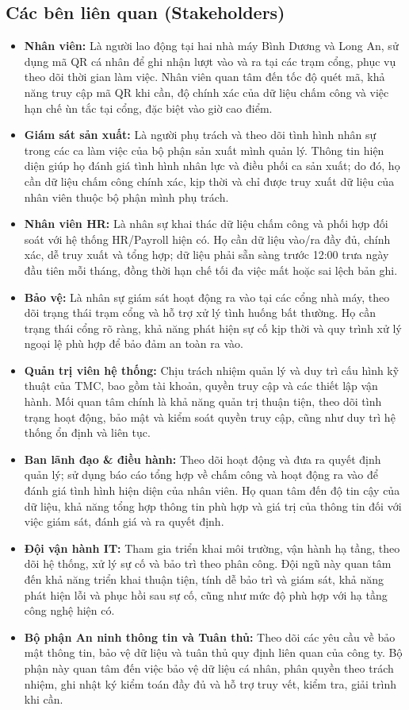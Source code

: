 \subsection{Các bên liên quan (Stakeholders)}

\begin{itemize}
    \item \textbf{Nhân viên:} Là người lao động tại hai nhà máy Bình Dương và Long An, sử dụng mã QR cá nhân để ghi nhận lượt vào và ra tại các trạm cổng, phục vụ theo dõi thời gian làm việc. Nhân viên quan tâm đến tốc độ quét mã, khả năng truy cập mã QR khi cần, độ chính xác của dữ liệu chấm công và việc hạn chế ùn tắc tại cổng, đặc biệt vào giờ cao điểm.
    \item \textbf{Giám sát sản xuất:} Là người phụ trách và theo dõi tình hình nhân sự trong các ca làm việc của bộ phận sản xuất mình quản lý. Thông tin hiện diện giúp họ đánh giá tình hình nhân lực và điều phối ca sản xuất; do đó, họ cần dữ liệu chấm công chính xác, kịp thời và chỉ được truy xuất dữ liệu của nhân viên thuộc bộ phận mình phụ trách.
    \item \textbf{Nhân viên HR:} Là nhân sự khai thác dữ liệu chấm công và phối hợp đối soát với hệ thống HR/Payroll hiện có. Họ cần dữ liệu vào/ra đầy đủ, chính xác, dễ truy xuất và tổng hợp; dữ liệu phải sẵn sàng trước 12:00 trưa ngày đầu tiên mỗi tháng, đồng thời hạn chế tối đa việc mất hoặc sai lệch bản ghi.
    \item \textbf{Bảo vệ:} Là nhân sự giám sát hoạt động ra vào tại các cổng nhà máy, theo dõi trạng thái trạm cổng và hỗ trợ xử lý tình huống bất thường. Họ cần trạng thái cổng rõ ràng, khả năng phát hiện sự cố kịp thời và quy trình xử lý ngoại lệ phù hợp để bảo đảm an toàn ra vào.
    \item \textbf{Quản trị viên hệ thống:} Chịu trách nhiệm quản lý và duy trì cấu hình kỹ thuật của TMC, bao gồm tài khoản, quyền truy cập và các thiết lập vận hành. Mối quan tâm chính là khả năng quản trị thuận tiện, theo dõi tình trạng hoạt động, bảo mật và kiểm soát quyền truy cập, cũng như duy trì hệ thống ổn định và liên tục.
    \item \textbf{Ban lãnh đạo \& điều hành:} Theo dõi hoạt động và đưa ra quyết định quản lý; sử dụng báo cáo tổng hợp về chấm công và hoạt động ra vào để đánh giá tình hình hiện diện của nhân viên. Họ quan tâm đến độ tin cậy của dữ liệu, khả năng tổng hợp thông tin phù hợp và giá trị của thông tin đối với việc giám sát, đánh giá và ra quyết định.
    \item \textbf{Đội vận hành IT:} Tham gia triển khai môi trường, vận hành hạ tầng, theo dõi hệ thống, xử lý sự cố và bảo trì theo phân công. Đội ngũ này quan tâm đến khả năng triển khai thuận tiện, tính dễ bảo trì và giám sát, khả năng phát hiện lỗi và phục hồi sau sự cố, cũng như mức độ phù hợp với hạ tầng công nghệ hiện có.
    \item \textbf{Bộ phận An ninh thông tin và Tuân thủ:} Theo dõi các yêu cầu về bảo mật thông tin, bảo vệ dữ liệu và tuân thủ quy định liên quan của công ty. Bộ phận này quan tâm đến việc bảo vệ dữ liệu cá nhân, phân quyền theo trách nhiệm, ghi nhật ký kiểm toán đầy đủ và hỗ trợ truy vết, kiểm tra, giải trình khi cần.
\end{itemize}

